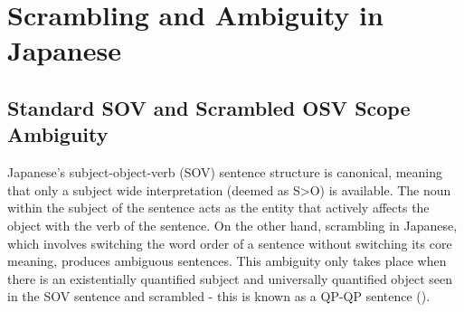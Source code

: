 \documentclass[english, 11pt]{article}
\begin{document}
\section{Scrambling and Ambiguity in Japanese}
\subsection{Standard SOV and Scrambled OSV Scope Ambiguity}
Japanese's subject-object-verb (SOV) sentence structure is canonical, meaning that only a subject wide interpretation (deemed as S>O) is available. The noun within the subject of the sentence acts as the entity that actively affects the object with the verb of the sentence. On the other hand, scrambling in Japanese, which involves switching the word order of a sentence without switching its core meaning, produces ambiguous sentences. This ambiguity only takes place when there is an existentially quantified subject and universally quantified object seen in the SOV sentence and scrambled - this is known as a QP-QP sentence (\cite{s1}).
\end{document}
